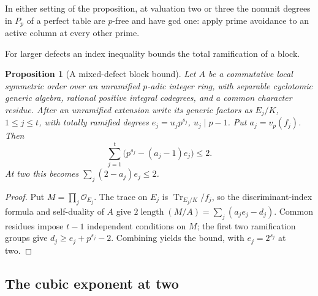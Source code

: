 \documentclass[11pt,a4paper]{article}
\numberwithin{equation}{section}
\newtheorem{proposition}[theorem]{Proposition}
\theoremstyle{remark}
\newcommand{\Tr}{\operatorname{Tr}}
\newcommand{\OO}{\mathcal O}
\begin{document}
In either setting of the proposition, at valuation two or three the
nonunit degrees in $P_p$ of a perfect table are $p$-free and have
gcd one: apply prime avoidance to an active column at every other prime.

For larger defects an index inequality bounds the total ramification of a block.

\begin{proposition}[A mixed-defect block bound]\label{fam:M:4.3}
\label{prop:mixed-discriminant-budget}
Let $A$ be a commutative local symmetric order over an unramified
$p$-adic integer ring, with separable cyclotomic generic algebra,
rational positive integral codegrees, and a common character residue.
After an unramified extension write its generic factors as
$E_j/K$, $1\le j\le t$, with totally ramified degrees
$e_j=u_jp^{s_j}$, $u_j\mid p-1$. Put $a_j=v_p(f_j)$.
Then
\[
 \sum_{j=1}^t\bigl(p^{s_j}-(a_j-1)e_j\bigr)\le2.
\]
At two this becomes $\sum_j(2-a_j)e_j\le2$.
\end{proposition}
\begin{proof}
Put $M=\prod_j\OO_{E_j}$. The trace on $E_j$ is $\Tr_{E_j/K}/f_j$,
so the discriminant-index formula and self-duality of $A$ give
$2\operatorname{length}(M/A)=\sum_j(a_je_j-d_j)$.
Common residues impose $t-1$ independent conditions on $M$;
the first two ramification groups give $d_j\ge e_j+p^{s_j}-2$.
Combining yields the bound, with $e_j=2^{s_j}$ at two.
\end{proof}

\subsection{The cubic exponent at two}\label{fam:M:sec:4.2}
\label{subsec:cubic-two-signed}
\end{document}
